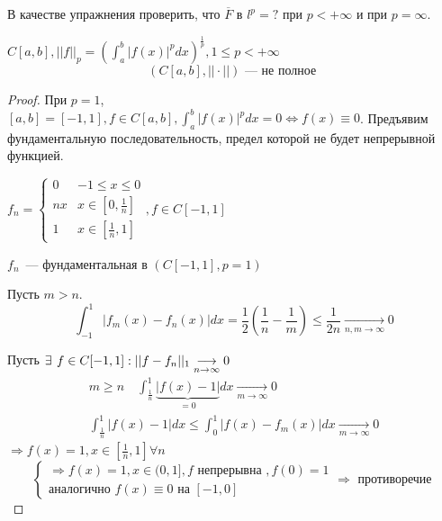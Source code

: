 \documentclass[document]{subfiles}
\begin{document}
В качестве упражнения проверить, что $\overline{F}$ в $l^p = ? $ при $p < + \infty$ и при $p = \infty$.
\begin{theorem}
    $C[a,b], ||f||_p = \left( \int^b_a |f(x)|^p dx \right)^{\frac{1}{p}}, 1 \leq p < + \infty$
    \[ (C[a,b], || \cdot || ) \text {~--- не полное } \]
\end{theorem}
\begin{proof}
    При $p = 1$, $[a,b] = [-1,1], f \in C[a,b], \int^b_a |f(x)|^p dx = 0 \Leftrightarrow f(x) \equiv 0$.
    Предъявим фундаментальную последовательность, предел которой не будет непрерывной функцией.

    $f_n = \begin{cases}
        0 & -1 \leq x \leq 0 \\
        nx & x \in [0, \frac{1}{n}] \\
        1 & x \in [\frac{1}{n}, 1]
    \end{cases}, f \in C[-1,1]$ %

    $f_n$~--- фундаментальная в $(C[-1,1], p=1)$

    Пусть $ m > n$. %
    \[ \int_{-1}^1 |f_m(x) - f_n(x)| dx = \frac{1}{2} \left( \frac{1}{n} - \frac{1}{m} \right) \leq \frac{1}{2n} \underset{n, m \to \infty}{\longrightarrow} 0 \]

    Пусть $\exists \, f \in C[-1,1] : \normunder{f-f_n}{1} \underset{n \to \infty}{\longrightarrow} 0$ 
    \begin{gather*}
        m \geq n \quad \int^1_{\frac{1}{n}} \underbrace{|f(x) - 1|}_{=0} dx  \underset{m \to \infty}{\longrightarrow} 0  \\
        \int^1_{\frac{1}{n}} {|f(x) - 1|} dx \leq \int^1_0 |f(x) - f_m(x)|dx \underset{m \to \infty}{\longrightarrow} 0
    \end{gather*}
    $\Rightarrow f(x) = 1, x \in \left[ \frac{1}{n}, 1 \right] \forall n $\\
    \[ \begin{cases}
       \Rightarrow f(x) = 1, x \in (0,1], f \text{ непрерывна }, f(0) = 1\\
        \text{аналогично } f(x) \equiv 0 \text{ на } [-1,0]
    \end{cases} \Rightarrow \text{ противоречие } \]
\end{proof}
\end{document}
